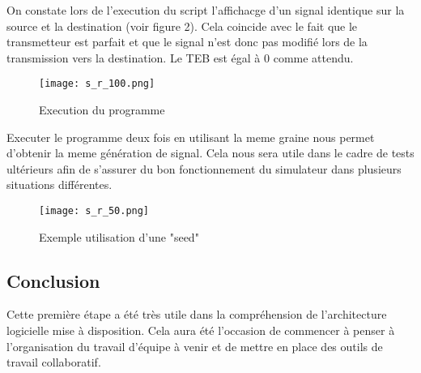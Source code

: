 On constate lors de l'execution du script l'affichacge d'un signal identique sur la source et la destination (voir figure 2). Cela coincide 
avec le fait que le transmetteur est parfait et que le signal n'est donc pas modifié lors de la transmission vers la destination.
Le TEB est égal à 0 comme attendu.

\begin{figure}[h]
    \centering
    \texttt{[image: s\_r\_100.png]}
    \caption{Execution du programme}
\end{figure}

\pagebreak

Executer le programme deux fois en utilisant la meme graine nous permet d'obtenir la meme génération de signal.
Cela nous sera utile dans le cadre de tests ultérieurs afin de s'assurer du bon fonctionnement du simulateur dans plusieurs situations différentes.

\begin{figure}[h]
    \centering
    \texttt{[image: s\_r\_50.png]}
    \caption{Exemple utilisation d'une "seed"}
\end{figure}


\subsection{Conclusion}

Cette première étape a été très utile dans la compréhension de l'architecture logicielle mise à disposition.
Cela aura été l'occasion de commencer à penser à l'organisation du travail d'équipe à venir et de mettre en place des outils de travail collaboratif.



